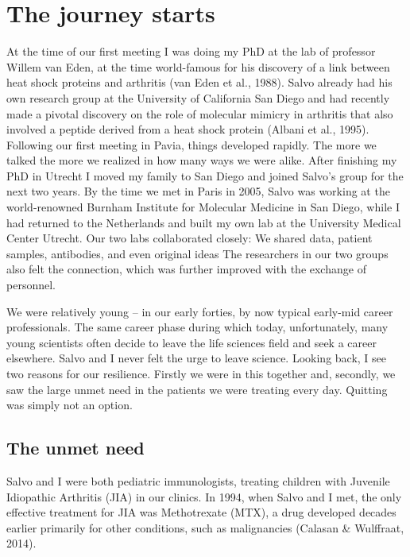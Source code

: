 \documentclass[authordate, editorial]{jote-new-article}
\begin{document}
	\section{The journey starts}



	At the time of our first meeting I was doing my PhD at the lab of professor Willem van Eden, at the time world-famous for his discovery of a link between heat shock proteins and arthritis (van Eden et al., 1988). Salvo already had his own research group at the University of California San Diego and had recently made a pivotal discovery on the role of molecular mimicry in arthritis that also involved a peptide derived from a heat shock protein (Albani et al., 1995). Following our first meeting in Pavia, things developed rapidly. The more we talked the more we realized in how many ways we were alike. After finishing my PhD in Utrecht I moved my family to San Diego and joined Salvo's group for the next two years. By the time we met in Paris in 2005, Salvo was working at the world-renowned Burnham Institute for Molecular Medicine in San Diego, while I had returned to the Netherlands and built my own lab at the University Medical Center Utrecht. Our two labs collaborated closely: We shared data, patient samples, antibodies, and even original ideas The researchers in our two groups also felt the connection, which was further improved with the exchange of personnel.







	We were relatively young -- in our early forties, by now typical early-mid career professionals. The same career phase during which today, unfortunately, many young scientists often decide to leave the life sciences field and seek a career elsewhere. Salvo and I never felt the urge to leave science. Looking back, I see two reasons for our resilience. Firstly we were in this together and, secondly, we saw the large unmet need in the patients we were treating every day. Quitting was simply not an option.







	\subsection{The unmet need}



	Salvo and I were both pediatric immunologists, treating children with Juvenile Idiopathic Arthritis (JIA) in our clinics. In 1994, when Salvo and I met, the only effective treatment for JIA was Methotrexate (MTX), a drug developed decades earlier primarily for other conditions, such as malignancies (Calasan \& Wulffraat, 2014).
\end{document}
